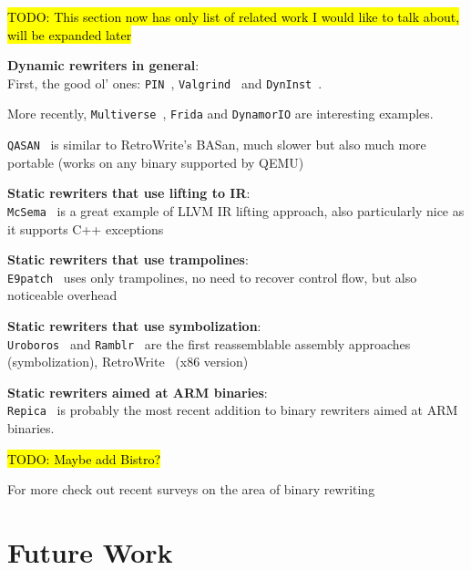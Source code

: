 \documentclass[a4paper,11pt,oneside]{report}
\newcommand{\sysname}{RetroWrite\xspace}
\newcommand{\todo}[1]{%
	\begingroup 
	\sethlcolor{cyan}%
	\hl{TODO: #1}%
	\endgroup
}
\begin{document}
{

\setlength{\parindent}{0cm}

\todo{This section now has only list of related work I would like to talk 
about, will be expanded later}



\textbf{Dynamic rewriters in general}:\\
First, the good ol' ones: \texttt{PIN}~\cite{pin}, 
\texttt{Valgrind}~\cite{valgrind} and \texttt{DynInst}~\cite{dyninst}.

More recently, \texttt{Multiverse}~\cite{multiverse}, \texttt{Frida} and 
\texttt{DynamorIO} are interesting examples.

\texttt{QASAN}~\cite{qasan} is similar to \sysname's BASan, much slower but 
also much more portable (works on any binary supported by QEMU)



\textbf{Static rewriters that use lifting to IR}:\\
\texttt{McSema}~\cite{mcsema} is a great example of LLVM IR lifting approach, 
also particularly nice as it supports C++ exceptions

\textbf{Static rewriters that use trampolines}:\\
\texttt{E9patch}~\cite{e9patch} uses only trampolines, no need to recover 
control flow, but also noticeable overhead


\textbf{Static rewriters that use symbolization}:\\
\texttt{Uroboros}~\cite{uroboros} and \texttt{Ramblr}~\cite{ramblr} are the 
first reassemblable assembly approaches (symbolization), 
\sysname~\cite{dinesh20oakland} (x86 version)

\textbf{Static rewriters aimed at ARM binaries}:\\
\texttt{Repica}~\cite{repica} is probably the most recent addition to binary 
rewriters aimed at ARM binaries.  

\todo{Maybe add Bistro?}~\cite{bistro}

For more check out recent surveys on the area of binary rewriting~\cite{binaryrewritingsurvey}

}

\chapter{Future Work}
\end{document}
